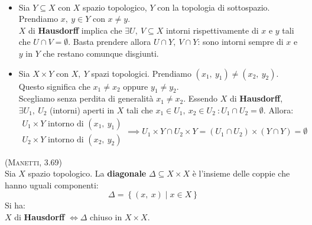 \begin{demonstration}~{}
\begin{itemize}
\item Sia $Y\subseteq X$ con $X$ spazio topologico, $Y$ con la topologia di sottospazio. Prendiamo $x,\ y\in Y$ con $x\neq y$.\\
$X$ di \textbf{Hausdorff} implica che $\exists U,\ V\subseteq X$ intorni rispettivamente di $x$ e $y$ tali che $U\cap V=\emptyset$. Basta prendere allora $U\cap Y,\ V\cap Y$: sono intorni sempre di $x$ e $y$ in $Y$ che restano comunque disgiunti.
\item Sia $X\times Y$ con $X,\ Y$ spazi topologici. Prendiamo $\left(x_1,\ y_1\right)\neq\left(x_2,\ y_2\right)$. Questo significa che $x_1\neq x_2$ oppure $y_1\neq y_2$.\\ Scegliamo senza perdita di generalità $x_1\neq x_2$. Essendo $X$ di \textbf{Hausdorff}, $\exists U_1,\ U_2$ (intorni) aperti in $X$  tali che $x_1\in U_1,\ x_2\in U_2\ \colon U_1\cap U_2=\emptyset$. Allora:
\begin{equation*}
\begin{array}{l}
	U_1\times Y\text{ intorno di }\left(x_1,\ y_1\right)\\
	U_2\times Y\text{ intorno di }\left(x_2,\ y_2\right)
\end{array}
\implies U_1\times Y\cap U_2\times Y=\left(U_1\cap U_2\right)\times\left(Y\cap Y\right)=\emptyset 
\end{equation*}
\end{itemize}
\end{demonstration}
\begin{theorema}\textsc{(Manetti, 3.69)}\\
Sia $X$ spazio topologico. La \textbf{diagonale} $\Delta\subseteq X\times X$ è l'insieme delle coppie che hanno uguali componenti:
\begin{equation}
	\Delta=\left\{\left(x,\ x\right)\mid x\in X\right\}
\end{equation}
Si ha:\\
$X$ di \textbf{Hausdorff} $\iff \Delta$ chiuso in $X\times X$.
\end{theorema}

